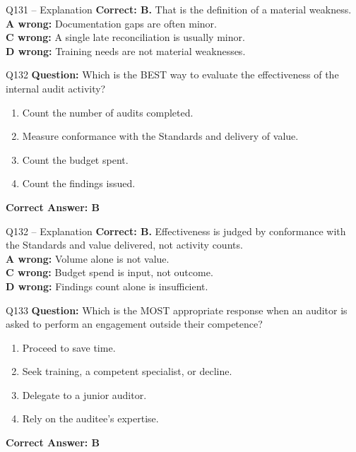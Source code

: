 \documentclass[aspectratio=169,10pt]{beamer}
\begin{document}
	\begin{frame}[t]{Q131 -- Explanation}
		\small
		\textbf{Correct: B.} That is the definition of a material weakness. \\[4pt]
		\textbf{A wrong:} Documentation gaps are often minor. \\[2pt]
		\textbf{C wrong:} A single late reconciliation is usually minor. \\[2pt]
		\textbf{D wrong:} Training needs are not material weaknesses.
	\end{frame}
	
	\begin{frame}[t]{Q132}
		\small
		\textbf{Question:} Which is the BEST way to evaluate the effectiveness of the internal audit activity?
		\begin{enumerate}[label=\Alph*.,itemsep=1pt,topsep=2pt]
			\item Count the number of audits completed.
			\item Measure conformance with the Standards and delivery of value.
			\item Count the budget spent.
			\item Count the findings issued.
		\end{enumerate}
		\vspace{4pt}
		\textbf{Correct Answer: B}
	\end{frame}
	
	\begin{frame}[t]{Q132 -- Explanation}
		\small
		\textbf{Correct: B.} Effectiveness is judged by conformance with the Standards and value delivered, not activity counts. \\[4pt]
		\textbf{A wrong:} Volume alone is not value. \\[2pt]
		\textbf{C wrong:} Budget spend is input, not outcome. \\[2pt]
		\textbf{D wrong:} Findings count alone is insufficient.
	\end{frame}
	
	\begin{frame}[t]{Q133}
		\small
		\textbf{Question:} Which is the MOST appropriate response when an auditor is asked to perform an engagement outside their competence?
		\begin{enumerate}[label=\Alph*.,itemsep=1pt,topsep=2pt]
			\item Proceed to save time.
			\item Seek training, a competent specialist, or decline.
			\item Delegate to a junior auditor.
			\item Rely on the auditee's expertise.
		\end{enumerate}
		\vspace{4pt}
		\textbf{Correct Answer: B}
	\end{frame}
	
\end{document}
